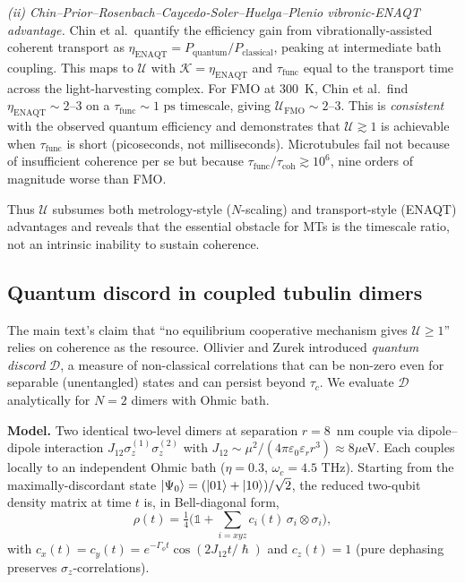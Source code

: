 \documentclass[twocolumn,10pt]{article}
\renewcommand{\hbar}{\hslash}
\newcommand{\ps}{\text{~ps}}
\newcommand{\THz}{\text{~THz}}
\begin{document}
\emph{(ii) Chin--Prior--Rosenbach--Caycedo-Soler--Huelga--Plenio
\cite{Chin2013} vibronic-ENAQT advantage.} Chin et al.\ quantify the
efficiency gain from vibrationally-assisted coherent transport as
$\eta_{\text{ENAQT}}=P_{\text{quantum}}/P_{\text{classical}}$, peaking at
intermediate bath coupling. This maps to $\mathcal{U}$ with
$\mathcal{K}=\eta_{\text{ENAQT}}$ and $\tau_{\text{func}}$ equal to the
transport time across the light-harvesting complex. For FMO at 300~K,
Chin et al.\ find $\eta_{\text{ENAQT}}\sim 2$--$3$ on a $\tau_{\text{func}}
\sim 1\ps$ timescale, giving $\mathcal{U}_{\text{FMO}}\sim 2$--$3$. This
is \emph{consistent} with the observed quantum efficiency and demonstrates
that $\mathcal{U}\gtrsim 1$ is achievable when $\tau_{\text{func}}$ is
short (picoseconds, not milliseconds). Microtubules fail not because of
insufficient coherence per se but because $\tau_{\text{func}}/\tau_{\text{coh}}
\gtrsim 10^6$, nine orders of magnitude worse than FMO.

Thus $\mathcal{U}$ subsumes both metrology-style ($N$-scaling) and
transport-style (ENAQT) advantages and reveals that the essential obstacle
for MTs is the timescale ratio, not an intrinsic inability to sustain
coherence.



\subsection{Quantum discord in coupled tubulin dimers}
\label{sec:discord}

The main text's claim that ``no equilibrium cooperative mechanism gives
$\mathcal{U}\ge 1$'' relies on coherence as the resource. Ollivier and
Zurek \cite{Ollivier2001} introduced \emph{quantum discord} $\mathcal{D}$,
a measure of non-classical correlations that can be non-zero even for
separable (unentangled) states and can persist beyond $\tau_c$. We
evaluate $\mathcal{D}$ analytically for $N=2$ dimers with Ohmic bath.

\textbf{Model.} Two identical two-level dimers at separation $r=8$~nm
couple via dipole--dipole interaction $J_{12}\sigma_z^{(1)}\sigma_z^{(2)}$
with $J_{12}\sim \mu^2/(4\pi\varepsilon_0\varepsilon_r r^3)\approx 8\mu$eV.
Each couples locally to an independent Ohmic bath
($\eta=0.3$, $\omega_c=4.5\THz$). Starting from the maximally-discordant
state $\ket{\Psi_0}=(\ket{01}+\ket{10})/\sqrt{2}$, the reduced
two-qubit density matrix at time $t$ is, in Bell-diagonal form,
\begin{equation}
\rho(t) = \tfrac{1}{4}\bigl(\mathbb{1}+\sum_{i=xyz}
c_i(t)\,\sigma_i\otimes\sigma_i\bigr),
\end{equation}
with $c_x(t)=c_y(t)=e^{-\Gamma_\phi t}\cos(2J_{12}t/\hbar)$ and
$c_z(t)=1$ (pure dephasing preserves $\sigma_z$-correlations).
\end{document}
